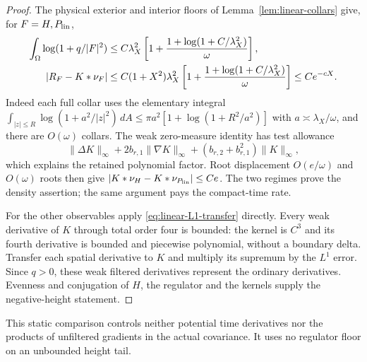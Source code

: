 \begin{proof}
The physical exterior and interior floors of
Lemma~\ref{lem:linear-collars} give, for $F=H,P_{\rm lin}$,
\begin{align}
 \int_\Omega\log(1+q/|F|^2)
 &\le C\lambda_X^2\left[
 1+\frac{1+\log(1+C/\lambda_X^2)}\omega\right],\notag\\
 |R_F-K*\nu_F|
 &\le C(1+X^2)\lambda_X^2\left[
 1+\frac{1+\log(1+C/\lambda_X^2)}\omega\right]
 \le Ce^{-cX}.
 \label{eq:linear-regulator-bias}
\end{align}
Indeed each full collar uses the elementary integral
$\int_{|z|\le R}\log(1+a^2/|z|^2)\,dA
\le\pi a^2[1+\log(1+R^2/a^2)]$ with
$a\asymp\lambda_X/\omega$, and there are $O(\omega)$ collars.
The weak zero-measure identity has test allowance
\[
 \|\Delta K\|_\infty
 +2b_{r,1}\|\nabla K\|_\infty
 +(b_{r,2}+b_{r,1}^2)\|K\|_\infty,
\]
which explains the retained polynomial factor.  Root displacement
$O(e/\omega)$ and $O(\omega)$ roots then give
$|K*\nu_H-K*\nu_{P_{\rm lin}}|\le Ce$.  The two regimes prove
the density assertion; the same argument pays the compact-time rate.

For the other observables apply \eqref{eq:linear-L1-transfer}
directly.  Every weak derivative of $K$ through total order four is
bounded: the kernel is $C^3$ and its fourth derivative is bounded and
piecewise polynomial, without a boundary delta.  Transfer each
spatial derivative to $K$ and multiply its supremum by the $L^1$
error.  Since $q>0$, these weak filtered derivatives represent the
ordinary derivatives.  Evenness and conjugation of $H$, the regulator
and the kernels supply the negative-height statement.
\end{proof}
This static comparison controls neither potential time derivatives
nor the products of unfiltered gradients in the actual covariance.
It uses no regulator floor on an unbounded height tail.

